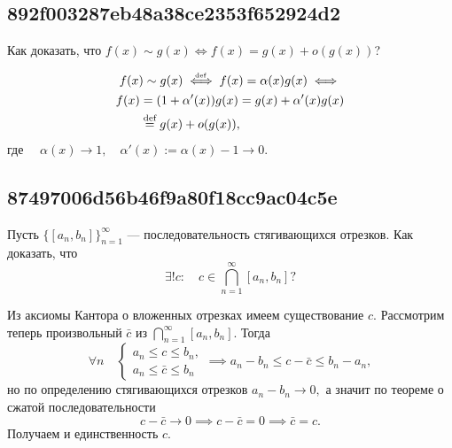 \documentclass[11pt, a5paper]{article}
\newenvironment{note}[1]{\goodbreak\par\subsection{\hfill \color{lightgray}\tiny #1}}{}
\newenvironment{cloze}[2][\ldots]{\begin{leftbar}}{\end{leftbar}}
\begin{document}
    \begin{note}{892f003287eb48a38ce2353f652924d2}
        Как доказать, что \( f(x) \sim g(x) \iff f(x) = g(x) + o(g(x)) \)?

        \begin{cloze}{1}
            \begin{multline*}
                f(x) \sim g(x) \overset{\hspace{-1pt}\text{\tiny def}}\iff f(x) = \alpha(x) g(x) \iff \\
                \begin{aligned}
                    f(x) &= (1 + \alpha'(x)) g(x) = g(x) + \alpha'(x)g(x) \\
                    &\overset{\text{def}}= g(x) + o(g(x)),
                \end{aligned}
            \end{multline*}
            где \( \quad \alpha(x) \to 1, \quad \alpha'(x) := \alpha(x) - 1 \to 0. \)
        \end{cloze}
    \end{note}

    \begin{note}{87497006d56b46f9a80f18cc9ac04c5e}
        Пусть \( \{ [a_n, b_n] \}_{n = 1}^{\infty } \) --- последовательность стягивающихся отрезков. Как доказать, что \[
            \exists! c : \quad c \in \bigcap _{n = 1} ^{\infty } [a_n, b_n]?
        \]

        \begin{cloze}{1}
            Из аксиомы Кантора о вложенных отрезках имеем существование \( c. \)
            Рассмотрим теперь произвольный \( \bar{c} \) из \( \bigcap_{n = 1}^{\infty } [a_n, b_n]. \) Тогда
            \[
                \forall n \quad \begin{cases}
                    a_n \leqslant c \leqslant b_n, \\
                    a_n \leqslant \bar{c} \leqslant b_n
                \end{cases}
                \implies a_n - b_n \leqslant c - \bar{c} \leqslant b_n - a_n,
            \]
            но по определению стягивающихся отрезков \( a_n - b_n \to 0,  \) а значит по теореме о сжатой последовательности
            \[
                c - \bar{c} \to 0 \implies c - \bar{c} = 0 \implies \bar{c} = c.
            \]
            Получаем и единственность \( c. \)
        \end{cloze}
    \end{note}
\end{document}
